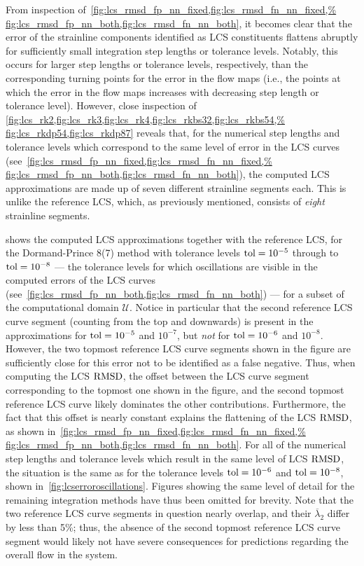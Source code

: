 From inspection of~\cref{fig:lcs_rmsd_fp_nn_fixed,fig:lcs_rmsd_fn_nn_fixed,%
fig:lcs_rmsd_fp_nn_both,fig:lcs_rmsd_fn_nn_both}, it becomes clear that the
error of the strainline components identified as LCS constituents flattens
abruptly for sufficiently small integration step lengths or tolerance levels.
Notably, this occurs for larger step lengths or tolerance levels, respectively,
than the corresponding turning points for the error in the flow maps (i.e.,
the points at which the error in the flow maps increases with decreasing step
length or tolerance level). However, close inspection of
\cref{fig:lcs_rk2,fig:lcs_rk3,fig:lcs_rk4,fig:lcs_rkbs32,fig:lcs_rkbs54,%
fig:lcs_rkdp54,fig:lcs_rkdp87} reveals that, for the numerical step lengths
and tolerance levels which correspond to the same level of error in the LCS
curves (see~\cref{fig:lcs_rmsd_fp_nn_fixed,fig:lcs_rmsd_fn_nn_fixed,%
fig:lcs_rmsd_fp_nn_both,fig:lcs_rmsd_fn_nn_both}), the computed LCS
approximations are made up of seven different strainline segments each. This
is unlike the reference LCS, which, as previously mentioned, consists
of \emph{eight} strainline segments.

 shows the computed LCS approximations together
with the reference LCS, for the Dormand-Prince 8(7) method with tolerance
levels $\textnormal{tol}=10^{-5}$ through to $\textnormal{tol}=10^{-8}$ ---
the tolerance levels for which oscillations are visible in the computed errors
of the LCS curves (see~\cref{fig:lcs_rmsd_fp_nn_both,fig:lcs_rmsd_fn_nn_both})
--- for a subset of the computational domain $\mathcal{U}$. Notice in
particular that the second reference LCS curve segment (counting from the top
and downwards) is present in the approximations for $\textnormal{tol}=10^{-5}$
and $10^{-7}$, but \emph{not} for $\textnormal{tol}=10^{-6}$ and $10^{-8}$.
However, the two topmost reference LCS curve segments shown in the figure
are sufficiently close for this error not to be identified as a false negative.
Thus, when computing the LCS $\operatorname{RMSD}$, the offset between the LCS curve segment
corresponding to the topmost one shown in the figure, and the second topmost
reference LCS curve likely dominates the other contributions. Furthermore, the
fact that this offset is nearly constant explains the flattening of the LCS
$\operatorname{RMSD}$, as shown in~\cref{fig:lcs_rmsd_fp_nn_fixed,fig:lcs_rmsd_fn_nn_fixed,%
fig:lcs_rmsd_fp_nn_both,fig:lcs_rmsd_fn_nn_both}. For all of the numerical step
lengths and tolerance levels which result in the same level of LCS $\operatorname{RMSD}$, the
situation is the same as for the  tolerance levels $\textnormal{tol}=10^{-6}$
and $\textnormal{tol}=10^{-8}$, shown in~\cref{fig:lcserroroscillations}. Figures
showing the same level of  detail for the remaining integration methods have
thus been omitted for brevity. Note that the two reference LCS curve
segments in question nearly overlap, and their $\overline{\lambda}_{2}$ differ
by less than 5\%; thus, the absence of the second topmost reference LCS curve
segment would likely not have severe consequences for predictions regarding
the overall flow in the system.

